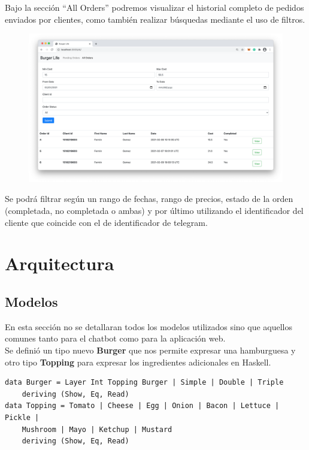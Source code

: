 \documentclass[a4paper,12pt]{article}
\begin{document}
Bajo la sección “All Orders” podremos visualizar el historial completo de pedidos enviados por clientes, como también realizar búsquedas mediante el uso de filtros.

\begin{figure}[H]
	\centering
	\includegraphics[width=1.0\linewidth]{webapp-search}
\end{figure}

Se podrá filtrar según un rango de fechas, rango de precios, estado de la orden (completada, no completada o ambas) y por último utilizando el identificador del cliente que coincide con el de identificador de telegram.

\pagebreak

\section{Arquitectura}

\subsection{Modelos}

En esta sección no se detallaran todos los modelos utilizados sino que aquellos comunes tanto para el chatbot como para la aplicación web.
\\
Se definió un tipo nuevo \textbf{Burger} que nos permite expresar una hamburguesa y otro tipo \textbf{Topping} para expresar los ingredientes adicionales en Haskell.

\begin{verbatim}
data Burger = Layer Int Topping Burger | Simple | Double | Triple 
	deriving (Show, Eq, Read)
data Topping = Tomato | Cheese | Egg | Onion | Bacon | Lettuce | Pickle |
	Mushroom | Mayo | Ketchup | Mustard  
	deriving (Show, Eq, Read)
\end{verbatim}
\end{document}
